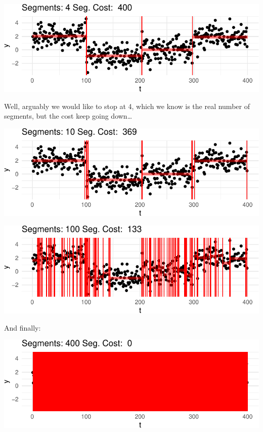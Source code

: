 \documentclass[
  letterpaper,
  DIV=11,
  numbers=noendperiod]{scrreprt}
\begin{document}
\includegraphics{3_multiple_changes_files/figure-pdf/unnamed-chunk-5-4.pdf}

Well, arguably we would like to stop at 4, which we know is the real
number of segments, but the cost keep going down\ldots{}

\includegraphics{3_multiple_changes_files/figure-pdf/unnamed-chunk-6-1.pdf}

\includegraphics{3_multiple_changes_files/figure-pdf/unnamed-chunk-6-2.pdf}

And finally:

\includegraphics{3_multiple_changes_files/figure-pdf/unnamed-chunk-7-1.pdf}
\end{document}
